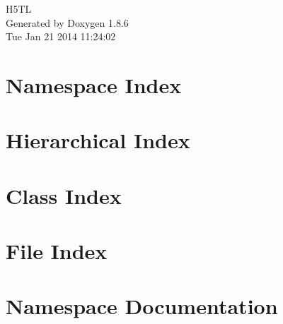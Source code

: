 \documentclass[twoside]{book}
\newcommand{\clearemptydoublepage}{%
  \newpage{\pagestyle{empty}\cleardoublepage}%
}
\begin{document}
\hypersetup{pageanchor=false}
\begin{titlepage}
\vspace*{7cm}
\begin{center}%
{\Large H5\-T\-L }\\
\vspace*{1cm}
{\large Generated by Doxygen 1.8.6}\\
\vspace*{0.5cm}
{\small Tue Jan 21 2014 11:24:02}\\
\end{center}
\end{titlepage}
\clearemptydoublepage
\tableofcontents
\clearemptydoublepage
{}
\hypersetup{pageanchor=true}

\chapter{Namespace Index}

\chapter{Hierarchical Index}

\chapter{Class Index}

\chapter{File Index}

\chapter{Namespace Documentation}


\end{document}
